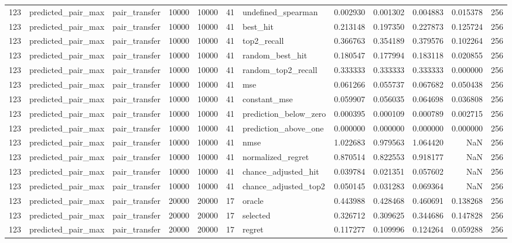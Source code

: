 \begin{tabular}{rllrrrlrrrrr}
123 & predicted_pair_max & pair_transfer & 10000 & 10000 & 41 & undefined_spearman & 0.002930 & 0.001302 & 0.004883 & 0.015378 & 256 \\
123 & predicted_pair_max & pair_transfer & 10000 & 10000 & 41 & best_hit & 0.213148 & 0.197350 & 0.227873 & 0.125724 & 256 \\
123 & predicted_pair_max & pair_transfer & 10000 & 10000 & 41 & top2_recall & 0.366763 & 0.354189 & 0.379576 & 0.102264 & 256 \\
123 & predicted_pair_max & pair_transfer & 10000 & 10000 & 41 & random_best_hit & 0.180547 & 0.177994 & 0.183118 & 0.020855 & 256 \\
123 & predicted_pair_max & pair_transfer & 10000 & 10000 & 41 & random_top2_recall & 0.333333 & 0.333333 & 0.333333 & 0.000000 & 256 \\
123 & predicted_pair_max & pair_transfer & 10000 & 10000 & 41 & mse & 0.061266 & 0.055737 & 0.067682 & 0.050438 & 256 \\
123 & predicted_pair_max & pair_transfer & 10000 & 10000 & 41 & constant_mse & 0.059907 & 0.056035 & 0.064698 & 0.036808 & 256 \\
123 & predicted_pair_max & pair_transfer & 10000 & 10000 & 41 & prediction_below_zero & 0.000395 & 0.000109 & 0.000789 & 0.002715 & 256 \\
123 & predicted_pair_max & pair_transfer & 10000 & 10000 & 41 & prediction_above_one & 0.000000 & 0.000000 & 0.000000 & 0.000000 & 256 \\
123 & predicted_pair_max & pair_transfer & 10000 & 10000 & 41 & nmse & 1.022683 & 0.979563 & 1.064420 & NaN & 256 \\
123 & predicted_pair_max & pair_transfer & 10000 & 10000 & 41 & normalized_regret & 0.870514 & 0.822553 & 0.918177 & NaN & 256 \\
123 & predicted_pair_max & pair_transfer & 10000 & 10000 & 41 & chance_adjusted_hit & 0.039784 & 0.021351 & 0.057602 & NaN & 256 \\
123 & predicted_pair_max & pair_transfer & 10000 & 10000 & 41 & chance_adjusted_top2 & 0.050145 & 0.031283 & 0.069364 & NaN & 256 \\
123 & predicted_pair_max & pair_transfer & 20000 & 20000 & 17 & oracle & 0.443988 & 0.428468 & 0.460691 & 0.138268 & 256 \\
123 & predicted_pair_max & pair_transfer & 20000 & 20000 & 17 & selected & 0.326712 & 0.309625 & 0.344686 & 0.147828 & 256 \\
123 & predicted_pair_max & pair_transfer & 20000 & 20000 & 17 & regret & 0.117277 & 0.109996 & 0.124264 & 0.059288 & 256 \\

\end{tabular}
